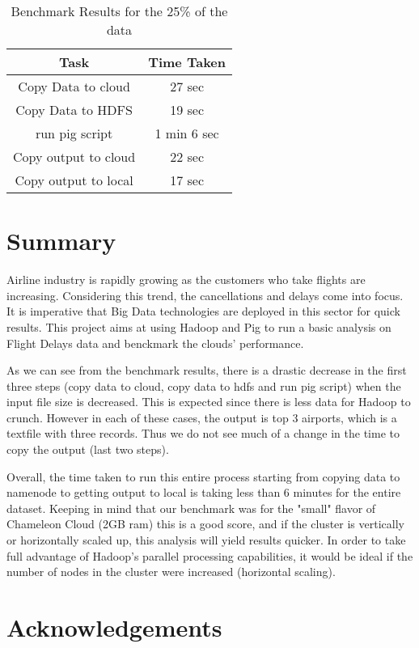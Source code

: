 \documentclass[9pt,twocolumn,twoside]{../../styles/osajnl}
\begin{document}
\begin{table}[h!]
\begin{tabular}{|c|c|}
\hline
\textbf{Task} & \textbf{Time Taken} \\ \hline
Copy Data to cloud & 27 sec  \\ \hline
Copy Data to HDFS & 19 sec  \\ \hline
run pig script & 1 min 6 sec  \\ \hline
Copy output to cloud & 22 sec  \\ \hline
Copy output to local & 17 sec  \\ \hline
\end{tabular}
\caption{Benchmark Results for the 25\% of the data}
\end{table}

\section{Summary}
Airline industry is rapidly growing as the customers who take flights are increasing. Considering this trend, the cancellations and delays come into focus. It is imperative that Big Data technologies are deployed in this sector for quick results. This project aims at using Hadoop and Pig to run a basic analysis on Flight Delays data and benckmark the clouds' performance. 

As we can see from the benchmark results, there is a drastic decrease in the first three steps (copy data to cloud, copy data to hdfs and run pig script) when the input file size is decreased. This is expected since there is less data for Hadoop to crunch. However in each of these cases, the output is top 3 airports, which is a textfile with three records. Thus we do not see much of a change in the time to copy the output (last two steps).

Overall, the time taken to run this entire process starting from copying data to namenode to getting output to local is taking less than 6 minutes for the entire dataset. Keeping in mind that our benchmark was for the "small" flavor of Chameleon Cloud (2GB ram) this is a good score, and if the cluster is vertically or horizontally scaled up, this analysis will yield results quicker. In order to take full advantage of Hadoop's parallel processing capabilities, it would be ideal if the number of nodes in the cluster were increased (horizontal scaling).



\section*{Acknowledgements}
\end{document}
